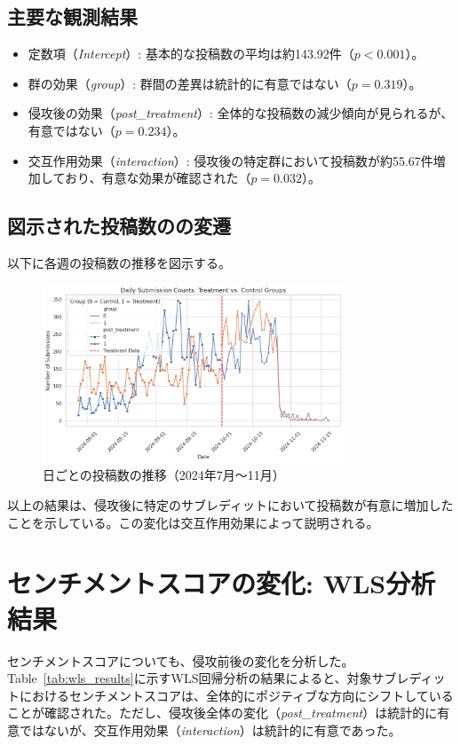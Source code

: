 \documentclass[11pt, a4j]{jreport}
\begin{document}
    \subsection*{主要な観測結果}
    \begin{itemize}
        \item 定数項（\textit{Intercept}）: 基本的な投稿数の平均は約143.92件（$p < 0.001$）。
        \item 群の効果（\textit{group}）: 群間の差異は統計的に有意ではない（$p = 0.319$）。
        \item 侵攻後の効果（\textit{post\_treatment}）: 全体的な投稿数の減少傾向が見られるが、有意ではない（$p = 0.234$）。
        \item 交互作用効果（\textit{interaction}）: 侵攻後の特定群において投稿数が約55.67件増加しており、有意な効果が確認された（$p = 0.032$）。
    \end{itemize}

    \subsection*{図示された投稿数のの変遷}
    以下に各週の投稿数の推移を図示する。
    \begin{figure}[H]
        \centering
        \includegraphics[width=0.8\textwidth]{submission_count_plot.png}
        \caption{日ごとの投稿数の推移（2024年7月～11月）}
        \label{fig:submissions_comments_trends}
    \end{figure}

    以上の結果は、侵攻後に特定のサブレディットにおいて投稿数が有意に増加したことを示している。この変化は交互作用効果によって説明される。

    \section{センチメントスコアの変化: WLS分析結果}
    センチメントスコアについても、侵攻前後の変化を分析した。Table~\ref{tab:wls_results}に示すWLS回帰分析の結果によると、対象サブレディットにおけるセンチメントスコアは、全体的にポジティブな方向にシフトしていることが確認された。ただし、侵攻後全体の変化（\textit{post\_treatment}）は統計的に有意ではないが、交互作用効果（\textit{interaction}）は統計的に有意であった。
\end{document}
